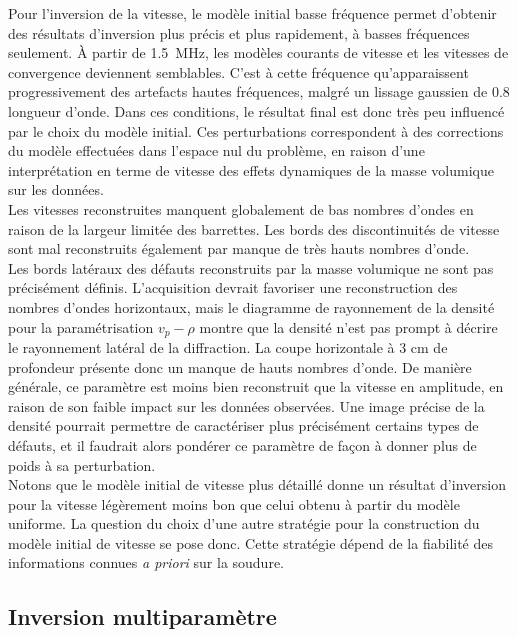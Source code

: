 Pour l'inversion de la vitesse, le modèle initial basse fréquence permet d'obtenir des résultats d'inversion plus précis et plus rapidement, à basses fréquences seulement. À partir de 1.5~MHz, les modèles courants de vitesse et les vitesses de convergence deviennent semblables. C'est à cette fréquence qu'apparaissent progressivement  des artefacts hautes fréquences, malgré un lissage gaussien de 0.8 longueur d'onde. Dans ces conditions, le résultat final est donc très peu influencé par le choix du modèle initial. Ces perturbations correspondent à des corrections du modèle effectuées dans l'espace nul du problème, en raison d'une interprétation en terme de vitesse des effets dynamiques de la masse volumique sur les données.\\ 
\indent Les vitesses reconstruites manquent globalement de bas nombres d'ondes en raison de la largeur limitée des barrettes. Les bords des discontinuités de vitesse sont mal reconstruits également par manque de très hauts nombres d'onde. \\


Les bords latéraux des défauts reconstruits par la masse volumique ne sont pas précisément définis. L'acquisition devrait favoriser une reconstruction des nombres d'ondes horizontaux, mais le diagramme de rayonnement de la densité pour la paramétrisation $v_{p}-\rho$ montre que la densité n'est pas prompt à décrire le rayonnement latéral de la diffraction. La coupe horizontale à 3 cm de profondeur présente donc un manque de hauts nombres d'onde. De manière générale, ce paramètre est moins bien reconstruit que la vitesse en amplitude, en raison de son faible impact sur les données observées. Une image précise de la densité pourrait permettre de caractériser plus précisément certains types de défauts, et il faudrait alors pondérer ce paramètre de façon à donner plus de poids à sa perturbation.\\

Notons que le modèle initial de vitesse plus détaillé donne un résultat d'inversion pour la vitesse légèrement moins bon que celui obtenu à partir du modèle uniforme. La question du choix d'une autre stratégie pour la construction du modèle initial de vitesse se pose donc. Cette stratégie dépend de la fiabilité des informations connues \emph{a priori} sur la soudure.



\subsection{Inversion multiparamètre}


